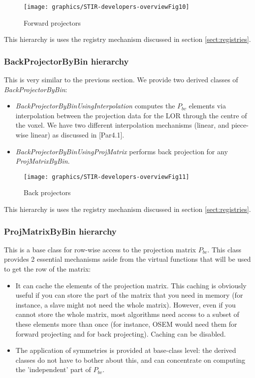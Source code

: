 \documentclass{article}
\begin{document}
\begin{figure}[htbp]
\begin{center}
\texttt{[image: graphics/STIR-developers-overviewFig10]}
\caption{Forward projectors}
\end{center}
\end{figure}
This hierarchy is uses the registry mechanism discussed in section 
\ref{sect:registries}.

\subsubsection{
BackProjectorByBin hierarchy}

This is very similar to the previous section. We provide two 
derived classes of \textit{BackProjectorByBin}: 
\begin{itemize}
\item 
\textit{BackProjectorByBinUsingInterpolation} computes the $P_{bv}$ 
elements via interpolation between the projection data for the 
LOR through the centre of the voxel. We have two different interpolation 
mechanisms (linear, and piece-wise linear) as discussed in [Par4.1].
\item 
\textit{BackProjectorByBinUsingProjMatrix} performs back projection 
for any \textit{ProjMatrixByBin}. 
\end{itemize}

\begin{figure}[htbp]
\begin{center}
\texttt{[image: graphics/STIR-developers-overviewFig11]}
\caption{Back projectors}
\end{center}
\end{figure}

This hierarchy is uses the registry mechanism discussed in section 
\ref{sect:registries}.

\subsubsection{
ProjMatrixByBin hierarchy}

This is a base class for row-wise access to the projection matrix $P_{bv}$. 
This class provides 2 essential mechanisms aside from the virtual 
functions that will be used to get the row of the matrix:
\begin{itemize}
\item 
It can cache the elements of the projection matrix. This caching 
is obviously useful if you can store the part of the matrix that 
you need in memory (for instance, a slave might not need the 
whole matrix). However, even if you cannot store the whole matrix, 
most algorithms need access to a subset of these elements more 
than once (for instance, OSEM would need them for forward projecting 
and for back projecting). Caching can be disabled.
\item 
The application of symmetries is provided at base-class level: 
the derived classes do not have to bother about this, and can 
concentrate on computing the 'independent' part of $P_{bv}$. 
\end{itemize}
\end{document}
